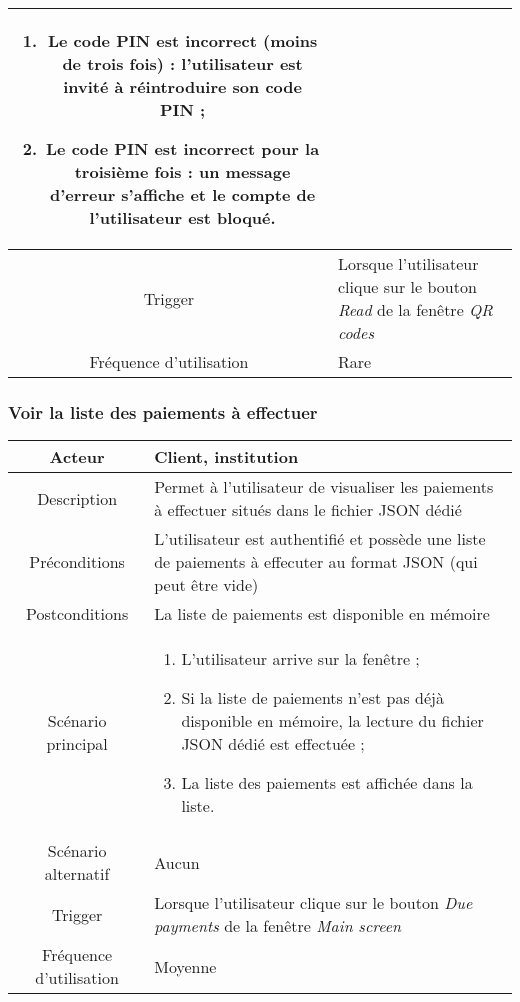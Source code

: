 \documentclass{article}
\begin{document}
\begin{table}[h!]
\begin{tabular}{|c|p{11cm}|}
\begin{enumerate}
\item Le code PIN est incorrect (moins de trois fois) : l'utilisateur est invité à réintroduire son code PIN ;
\item Le code PIN est incorrect pour la troisième fois : un message d'erreur s'affiche et le compte de l'utilisateur est bloqué.
\end{enumerate} \\
\hline
Trigger & Lorsque l'utilisateur clique sur le bouton \emph{Read} de la fenêtre \emph{QR codes} \\
\hline
Fréquence d'utilisation & Rare \\
\hline
\end{tabular}

\end{table}


\newpage


\subsubsection{Voir la liste des paiements à effectuer}
\begin{table}[h!]

\begin{tabular}{|c|p{11cm}|}
\hline
Acteur & Client, institution \\
\hline
Description & Permet à l'utilisateur de visualiser les paiements à effectuer situés dans le fichier JSON dédié \\
\hline
Préconditions & L'utilisateur est authentifié et possède une liste de paiements à effecuter au format JSON (qui peut être vide) \\
\hline
Postconditions & La liste de paiements est disponible en mémoire \\
\hline
Scénario principal & \begin{enumerate}
\item L'utilisateur arrive sur la fenêtre ;
\item Si la liste de paiements n'est pas déjà disponible en mémoire, la lecture du fichier JSON dédié est effectuée ;
\item La liste des paiements est affichée dans la liste.
\end{enumerate} \\
\hline
Scénario alternatif & Aucun \\
\hline
Trigger & Lorsque l'utilisateur clique sur le bouton \emph{Due payments} de la fenêtre \emph{Main screen} \\
\hline
Fréquence d'utilisation & Moyenne \\
\hline
\end{tabular}

\end{table}
\end{document}
